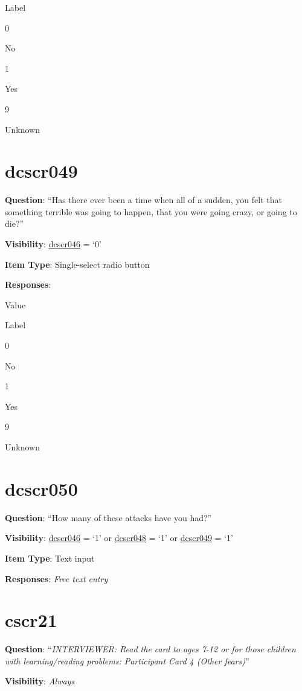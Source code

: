 \documentclass[]{book}
\begin{document}
Label

0

No

1

Yes

9

Unknown

\hypertarget{dcscr049}{%
\section{dcscr049}\label{dcscr049}}

\textbf{Question}: ``Has there ever been a time when all of a sudden, you felt that something terrible was going to happen, that you were going crazy, or going to die?''

\textbf{Visibility}: \protect\hyperlink{dcscr046}{dcscr046} = `0'

\textbf{Item Type}: Single-select radio button

\textbf{Responses}:

Value

Label

0

No

1

Yes

9

Unknown

\hypertarget{dcscr050}{%
\section{dcscr050}\label{dcscr050}}

\textbf{Question}: ``How many of these attacks have you had?''

\textbf{Visibility}: \protect\hyperlink{dcscr046}{dcscr046} = `1' or \protect\hyperlink{dcscr048}{dcscr048} = `1' or \protect\hyperlink{dcscr049}{dcscr049} = `1'

\textbf{Item Type}: Text input

\textbf{Responses}: \emph{Free text entry}

\hypertarget{cscr21}{%
\section{cscr21}\label{cscr21}}

\textbf{Question}: ``\emph{INTERVIEWER: Read the card to ages 7-12 or for those children with learning/reading problems: Participant Card 4 (Other fears)}''

\textbf{Visibility}: \emph{Always}
\end{document}
